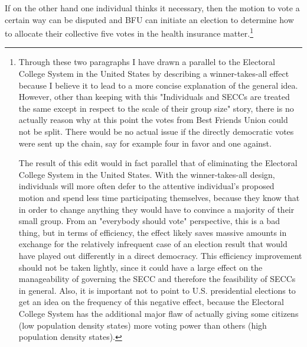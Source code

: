 \documentclass{article}[10pt]
\begin{document}
If on the other hand one individual thinks it necessary, then the motion to vote a certain way can be disputed and BFU can initiate an election to determine how to allocate their collective five votes in the health insurance matter.\footnote{
    Through these two paragraphs I have drawn a parallel to the Electoral College System in the United States by describing a winner-takes-all effect because I believe it to lead to a more concise explanation of the general idea.
    However, other than keeping with this "Individuals and SECCs are treated the same except in respect to the scale of their group size" story, there is no actually reason why at this point the votes from Best Friends Union could not be split.
    There would be no actual issue if the directly democratic votes were sent up the chain, say for example four in favor and one against.\par
    The result of this edit would in fact parallel that of eliminating the Electoral College System in the United States.
    With the winner-takes-all design, individuals will more often defer to the attentive individual's proposed motion and spend less time participating themselves, because they know that in order to change anything they would have to convince a majority of their small group.
    From an "everybody should vote" perspective, this is a bad thing, but in terms of efficiency, the effect likely saves massive amounts in exchange for the relatively infrequent case of an election result that would have played out differently in a direct democracy.
    This efficiency improvement should not be taken lightly, since it could have a large effect on the manageability of governing the SECC and therefore the feasibility of SECCs in general. 
    Also, it is important not to point to U.S. presidential elections to get an idea on the frequency of this negative effect, because the Electoral College System has the additional major flaw of actually giving some citizens (low population density states) more voting power than others (high population density states).}\par
\end{document}
